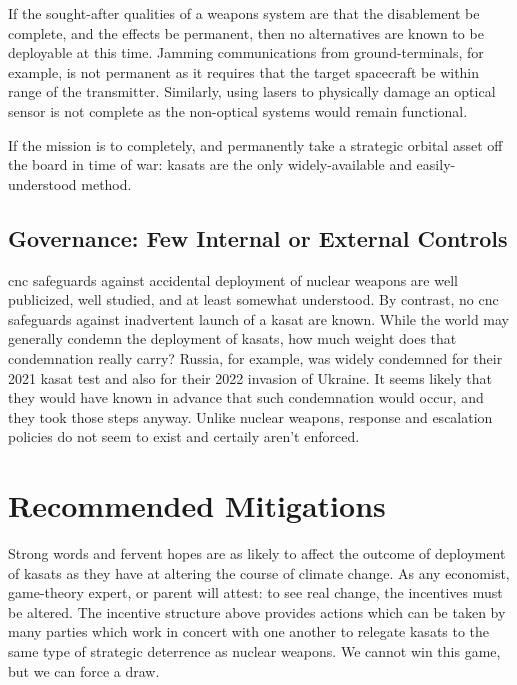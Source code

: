 If the sought-after qualities of a weapons system are that the
disablement be complete, and the effects be permanent, then no
alternatives are known to be deployable at this time.  Jamming
communications from ground-terminals, for example, is not permanent as
it requires that the target spacecraft be within range of the
transmitter.  Similarly, using \acp{laser} to physically damage an
optical sensor is not complete as the non-optical systems would remain
functional.

If the mission is to completely, and permanently take a strategic
orbital asset off the board in time of war: \acp{kasat} are the only
widely-available and easily-understood method.


\subsection*{Governance: Few Internal or External Controls}

\ac{cnc} safeguards against accidental deployment of nuclear weapons
are well publicized, well studied, and at least somewhat understood.
By contrast, no \ac{cnc} safeguards against inadvertent launch of a
\ac{kasat} are known.  While the world may generally condemn the
deployment of \acp{kasat}, how much weight does that condemnation
really carry?  Russia, for example, was widely condemned for their
2021 \ac{kasat} test and also for their 2022 invasion of Ukraine.  It
seems likely that they would have known in advance that such
condemnation would occur, and they took those steps anyway.  Unlike
nuclear weapons, response and escalation policies do not seem to
exist and certaily aren't enforced.


\section*{Recommended Mitigations}

Strong words and fervent hopes are as likely to affect the outcome of
deployment of \acp{kasat} as they have at altering the course of
climate change.  As any economist, game-theory expert, or parent will
attest: to see real change, the incentives must be altered.  The
incentive structure above provides actions which can be taken by many
parties which work in concert with one another to relegate \acp{kasat}
to the same type of strategic deterrence as nuclear weapons.  We
cannot win this game, but we can force a draw.


